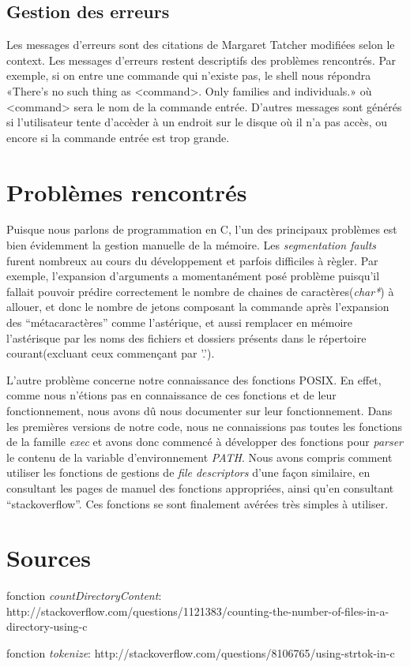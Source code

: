 \documentclass[letterpaper,12pt]{scrartcl}
\begin{document}
		\subsection{Gestion des erreurs}
			Les messages d'erreurs sont des citations de Margaret Tatcher modifiées selon le context. Les messages d'erreurs restent descriptifs des problèmes rencontrés. Par exemple, si on entre une commande qui n'existe pas, le shell nous répondra «There's no such thing as <command>. Only families and individuals.» où <command> sera le nom de la commande entrée. D'autres messages sont générés si l'utilisateur tente d'accèder à un endroit sur le disque où il n'a pas accès, ou encore si la commande entrée est trop grande. 

	        \section{Problèmes rencontrés}
		Puisque nous parlons de programmation en C, l'un des principaux problèmes est bien évidemment la gestion manuelle de la mémoire. Les \textit{segmentation faults} furent nombreux au cours du développement et parfois difficiles à règler. Par exemple, l'expansion d'arguments a momentanément posé problème puisqu'il fallait pouvoir prédire correctement le nombre de chaines de caractères(\textit{char*}) à allouer, et donc le nombre de jetons composant la commande après l'expansion des ``métacaractères'' comme l'astérique, et aussi remplacer en mémoire l'astérisque par les noms des fichiers et dossiers présents dans le répertoire courant(excluant ceux commençant par '.'). 

		L'autre problème concerne notre connaissance des fonctions POSIX. En effet, comme nous n'étions pas en connaissance de ces fonctions et de leur fonctionnement, nous avons dû nous documenter sur leur fonctionnement. Dans les premières versions de notre code, nous ne connaissions pas toutes les fonctions de la famille \textit{exec} et avons donc commencé à développer des fonctions pour \textit{parser} le contenu de la variable d'environnement \textit{PATH}. Nous avons compris comment utiliser les fonctions de gestions de \textit{file descriptors} d'une façon similaire, en consultant les pages de manuel des fonctions appropriées, ainsi qu'en consultant ``stackoverflow''. Ces fonctions se sont finalement avérées très simples à utiliser.

        \section{Sources}
        fonction \textit{countDirectoryContent}: http://stackoverflow.com/questions/1121383/counting-the-number-of-files-in-a-directory-using-c
        
        fonction \textit{tokenize}: http://stackoverflow.com/questions/8106765/using-strtok-in-c
        
\end{document}
